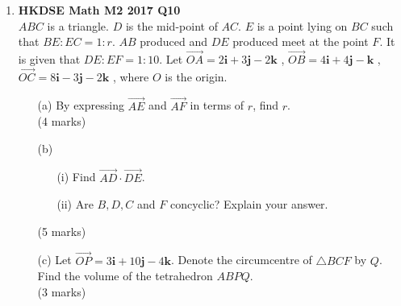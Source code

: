 \documentclass[12pt]{article}
\begin{document}
\begin{enumerate}
	\item \textbf{HKDSE Math M2 2017 Q10}\\
	$ABC$ is a triangle. $D$ is the mid-point of $AC$. $E$ is a point lying on $BC$ such that $BE : EC = 1 : r$. $AB$ produced and $DE$ produced meet at the point $F$. It is given that $DE : EF = 1 : 10$. Let 
		$\overrightarrow{OA} = 2\textbf{i} +3 \textbf{j} -2\textbf {k}$ , 
		$\overrightarrow{OB} = 4\textbf{i} +4 \textbf{j} - \textbf {k}$ , 
		$\overrightarrow{OC} = 8\textbf{i} -3 \textbf{j} -2\textbf {k}$ , where $O$ is the origin.
	\begin{enumerate}
		\item [(a)]By expressing $\overrightarrow{AE}$ and $\overrightarrow{AF}$ in terms of $r$, find $r$.\\(4 marks)
		\item [(b)]
		\begin{enumerate}
			\item [(i)]Find $\overrightarrow{AD} \cdot \overrightarrow{DE}$. 
			\item [(ii)]Are $B, D, C$ and $F$ concyclic? Explain your answer.
		\end{enumerate}
		(5 marks)
		\item[(c)]Let $\overrightarrow{OP} = 3\textbf{i} +10 \textbf{j} -4\textbf {k}$. Denote the circumcentre of $\triangle BCF $ by $ Q$. Find the volume of the tetrahedron $ABPQ$. \\(3 marks)
	\end{enumerate}


\end{enumerate}
\end{document}
